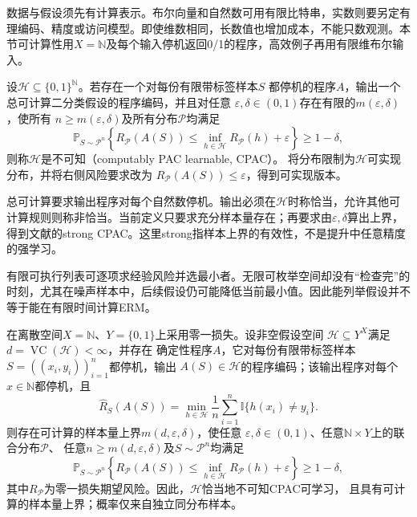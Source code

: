 数据与假设须先有计算表示。布尔向量和自然数可用有限比特串，实数则要另定有理编码、精度或访问模型。即使维数相同，长数值也增加成本，不能只数观测。本节可计算性用$X=\mathbb N$及每个输入停机返回0/1的程序，高效例子再用有限维布尔输入。

\begin{definition}[可计算PAC学习]
\label{def:binary-computable-pac}
设$\mathcal H\subseteq\{0,1\}^{\mathbb N}$。若存在一个对每份有限带标签样本$S$
都停机的程序$A$，输出一个总可计算二分类假设的程序编码，并且对任意
$\varepsilon,\delta\in(0,1)$存在有限的$m(\varepsilon,\delta)$，使所有
$n\geq m(\varepsilon,\delta)$及所有分布$\mathcal P$均满足
\[
 \mathbb P_{S\sim\mathcal P^n}\left\{
 R_{\mathcal P}(A(S))\leq\inf_{h\in\mathcal H}R_{\mathcal P}(h)+\varepsilon
 \right\}\geq1-\delta,
\]
则称$\mathcal H$是不可知（computably PAC learnable, CPAC）。
将分布限制为$\mathcal H$可实现分布，并将右侧风险要求改为
$R_{\mathcal P}(A(S))\leq\varepsilon$，得到可实现版本。
\end{definition}

总可计算要求输出程序对每个自然数停机。输出必须在$\mathcal H$时称恰当，允许其他可计算规则则称非恰当。当前定义只要求充分样本量存在；再要求由$\varepsilon,\delta$算出上界，得到文献的strong CPAC。这里strong指样本上界的有效性，不是提升中任意精度的强学习。

有限可执行列表可逐项求经验风险并选最小者。无限可枚举空间却没有“检查完”的时刻，尤其在噪声样本中，后续假设仍可能降低当前最小值。因此能列举假设并不等于能在有限时间计算ERM。

\begin{theorem}[可计算ERM给出的学习保证]
\label{thm:computable-erm-pac}
在离散空间$X=\mathbb N$、$Y=\{0,1\}$上采用零一损失。设非空假设空间
$\mathcal H\subseteq Y^X$满足$d=\operatorname{VC}(\mathcal H)<\infty$，并存在
确定性程序$A$，它对每份有限带标签样本$S=((x_i,y_i))_{i=1}^n$都停机，输出
$A(S)\in\mathcal H$的程序编码；该输出程序对每个$x\in\mathbb N$都停机，且
\[
 \hat R_S(A(S))
 =\min_{h\in\mathcal H}\frac1n\sum_{i=1}^n\mathbb I\{h(x_i)\neq y_i\}.
\]
则存在可计算的样本量上界$m(d,\varepsilon,\delta)$，使任意
$\varepsilon,\delta\in(0,1)$、任意$\mathbb N\times Y$上的联合分布$\mathcal P$、
任意$n\geq m(d,\varepsilon,\delta)$及$S\sim\mathcal P^n$均满足
\[
 \mathbb P_{S\sim\mathcal P^n}\left\{
 R_{\mathcal P}(A(S))
 \leq\inf_{h\in\mathcal H}R_{\mathcal P}(h)+\varepsilon
 \right\}\geq1-\delta,
\]
其中$R_{\mathcal P}$为零一损失期望风险。因此，$\mathcal H$恰当地不可知CPAC可学习，
且具有可计算的样本量上界；概率仅来自独立同分布样本。
\end{theorem}

